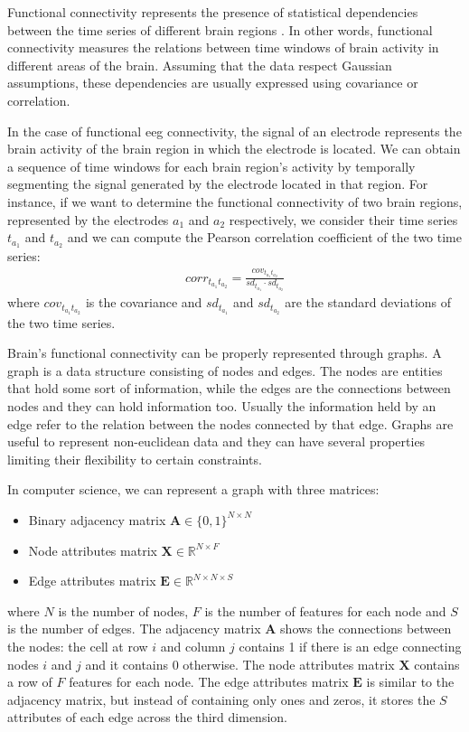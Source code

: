 Functional connectivity represents the presence of statistical dependencies between the time series of different brain regions \cite{NeurobiologyLanguage:functionalconnectivity}. In other words, functional connectivity measures the relations between time windows of brain activity in different areas of the brain. Assuming that the data respect Gaussian assumptions, these dependencies are usually expressed using covariance or correlation.

In the case of functional \acs{eeg} connectivity, the signal of an electrode represents the brain activity of the brain region in which the electrode is located. We can obtain a sequence of time windows for each brain region's activity by temporally segmenting the signal generated by the electrode located in that region. For instance, if we want to determine the functional connectivity of two brain regions, represented by the electrodes $a_1$ and $a_2$ respectively, we consider their time series $t_{a_1}$ and $t_{a_2}$ and we can compute the Pearson correlation coefficient of the two time series:
\begin{align}
    \textit{corr}_{t_{a_1} t_{a_2}} = \frac{\textit{cov}_{t_{a_1} t_{a_2}}}{\textit{sd}_{t_{a_1}} \cdot \textit{sd}_{t_{a_2}}}
\end{align}
where $\textit{cov}_{t_{a_1} t_{a_2}}$ is the covariance and $\textit{sd}_{t_{a_1}}$ and $\textit{sd}_{t_{a_2}}$ are the standard deviations of the two time series.

Brain's functional connectivity can be properly represented through graphs. A graph is a data structure consisting of nodes and edges. The nodes are entities that hold some sort of information, while the edges are the connections between nodes and they can hold information too. Usually the information held by an edge refer to the relation between the nodes connected by that edge. Graphs are useful to represent non-euclidean data and they can have several properties limiting their flexibility to certain constraints.

In computer science, we can represent a graph with three matrices:
\begin{itemize}
    \item Binary adjacency matrix $\mathbf{A} \in\{0,1\}^{N \times N}$
    \item Node attributes matrix $\mathbf{X} \in \mathbb{R}^{N \times F}$
    \item Edge attributes matrix $\mathbf{E} \in \mathbb{R}^{N \times N \times S}$
\end{itemize}
where $N$ is the number of nodes, $F$ is the number of features for each node and $S$ is the number of edges. The adjacency matrix $\mathbf{A}$ shows the connections between the nodes: the cell at row $i$ and column $j$ contains 1 if there is an edge connecting nodes $i$ and $j$ and it contains 0 otherwise. The node attributes matrix $\mathbf{X}$ contains a row of $F$ features for each node. The edge attributes matrix $\mathbf{E}$ is similar to the adjacency matrix, but instead of containing only ones and zeros, it stores the $S$ attributes of each edge across the third dimension.


